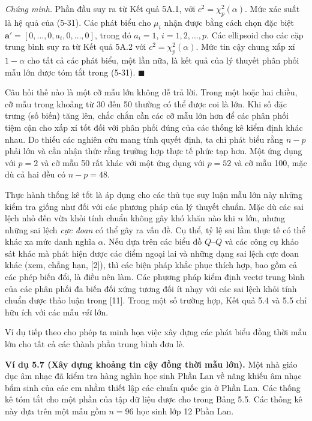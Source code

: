 \medskip
\noindent\textit{Chứng minh.} Phần đầu suy ra từ Kết quả 5A.1, với $c^2=\chi_p^2(\alpha)$. Mức xác suất là hệ quả của (5-31). Các phát biểu cho $\mu_i$ nhận được bằng cách chọn đặc biệt $\mathbf{a}'=[0,\dots,0,a_i,0,\dots,0]$, trong đó $a_i=1$, $i=1,2,\dots,p$. Các ellipsoid cho các cặp trung bình suy ra từ Kết quả 5A.2 với $c^2=\chi_p^2(\alpha)$. Mức tin cậy chung xấp xỉ $1-\alpha$ cho tất cả các phát biểu, một lần nữa, là kết quả của lý thuyết phân phối mẫu lớn được tóm tắt trong (5-31). \hfill$\blacksquare$

\medskip
Câu hỏi thế nào là một cỡ mẫu lớn không dễ trả lời. Trong một hoặc hai chiều, cỡ mẫu trong khoảng từ 30 đến 50 thường có thể được coi là lớn. Khi số đặc trưng (số biến) tăng lên, chắc chắn cần các cỡ mẫu lớn hơn để các phân phối tiệm cận cho xấp xỉ tốt đối với phân phối đúng của các thống kê kiểm định khác nhau. Do thiếu các nghiên cứu mang tính quyết định, ta chỉ phát biểu rằng $n-p$ phải lớn và cần nhận thức rằng trường hợp thực tế phức tạp hơn. Một ứng dụng với $p=2$ và cỡ mẫu 50 rất khác với một ứng dụng với $p=52$ và cỡ mẫu 100, mặc dù cả hai đều có $n-p=48$.

Thực hành thống kê tốt là áp dụng cho các thủ tục suy luận mẫu lớn này những kiểm tra giống như đối với các phương pháp của lý thuyết chuẩn. Mặc dù các sai lệch nhỏ đến vừa khỏi tính chuẩn không gây khó khăn nào khi $n$ lớn, nhưng những sai lệch \emph{cực đoan} có thể gây ra vấn đề. Cụ thể, tỷ lệ sai lầm thực tế có thể khác xa mức danh nghĩa $\alpha$. Nếu dựa trên các biểu đồ $Q$--$Q$ và các công cụ khảo sát khác mà phát hiện được các điểm ngoại lai và những dạng sai lệch cực đoan khác (xem, chẳng hạn, [2]), thì các biện pháp khắc phục thích hợp, bao gồm cả các phép biến đổi, là điều nên làm. Các phương pháp kiểm định vectơ trung bình của các phân phối đa biến đối xứng tương đối ít nhạy với các sai lệch khỏi tính chuẩn được thảo luận trong [11]. Trong một số trường hợp, Kết quả 5.4 và 5.5 chỉ hữu ích với các mẫu \emph{rất} lớn.

Ví dụ tiếp theo cho phép ta minh họa việc xây dựng các phát biểu đồng thời mẫu lớn cho tất cả các thành phần trung bình đơn lẻ.

\medskip
\noindent\textbf{Ví dụ 5.7 (Xây dựng khoảng tin cậy đồng thời mẫu lớn).} Một nhà giáo dục âm nhạc đã kiểm tra hàng nghìn học sinh Phần Lan về năng khiếu âm nhạc bẩm sinh của các em nhằm thiết lập các chuẩn quốc gia ở Phần Lan. Các thống kê tóm tắt cho một phần của tập dữ liệu được cho trong Bảng 5.5. Các thống kê này dựa trên một mẫu gồm $n=96$ học sinh lớp 12 Phần Lan.

